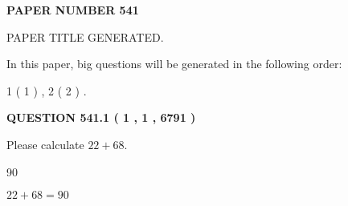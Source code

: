 \documentclass[12pt]{article}
\begin{document}
   
   
   
\newpage 
\setcounter{page}{ 
   541001 } 
   
   
   
   
 {\textbf{ \Large{ PAPER NUMBER  541  }}}
   
   
\vspace{0.2in}
   
   
   
   
   
   
   
   
 \vspace{0.2in}
 
 
 
 
   
   
 PAPER TITLE GENERATED.
   
   
   
\vspace{0.2in}
   
In this paper, big questions will be generated in the following order: 
   
   
   1 ( 1 )
 ,
   2 ( 2 )
 .
  
\vspace{0.2in}
  
{\textbf{\Large{QUESTION
541.1 
 ( 1 , 1 , 6791 )
}}}
  
  
 
Please calculate $ %
22 +  %
68 $.
 
 
 
\noindent{}
 
 

90
 
 
\noindent{}
 
 

 
 
 
\noindent{}
 
 

$ %
22 +  %
68=   %
90$
 
 
\noindent{}
 
 

 
   
   
   
\end{document}
